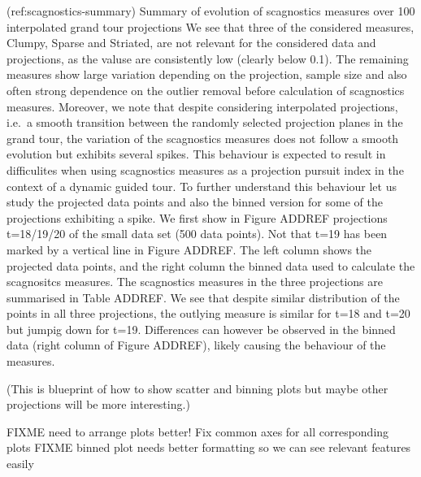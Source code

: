 \documentclass[article]{jss}
\begin{document}
(ref:scagnostics-summary) Summary of evolution of scagnostics measures
over 100 interpolated grand tour projections We see that three of the
considered measures, Clumpy, Sparse and Striated, are not relevant for
the considered data and projections, as the valuse are consistently low
(clearly below 0.1). The remaining measures show large variation
depending on the projection, sample size and also often strong
dependence on the outlier removal before calculation of scagnostics
measures. Moreover, we note that despite considering interpolated
projections, i.e.~a smooth transition between the randomly selected
projection planes in the grand tour, the variation of the scagnostics
measures does not follow a smooth evolution but exhibits several spikes.
This behaviour is expected to result in difficulites when using
scagnostics measures as a projection pursuit index in the context of a
dynamic guided tour. To further understand this behaviour let us study
the projected data points and also the binned version for some of the
projections exhibiting a spike. We first show in Figure ADDREF
projections t=18/19/20 of the small data set (500 data points). Not that
t=19 has been marked by a vertical line in Figure ADDREF. The left
column shows the projected data points, and the right column the binned
data used to calculate the scagnositcs measures. The scagnostics
measures in the three projections are summarised in Table ADDREF. We see
that despite similar distribution of the points in all three
projections, the outlying measure is similar for t=18 and t=20 but
jumpig down for t=19. Differences can however be observed in the binned
data (right column of Figure ADDREF), likely causing the behaviour of
the measures.

(This is blueprint of how to show scatter and binning plots but maybe
other projections will be more interesting.)

FIXME need to arrange plots better! Fix common axes for all
corresponding plots FIXME binned plot needs better formatting so we can
see relevant features easily
\end{document}
